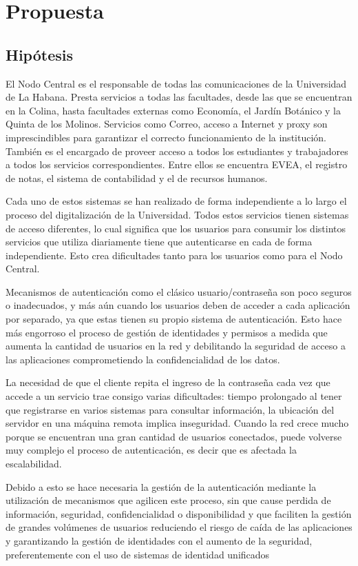 \chapter{Propuesta}\label{chapter:proposal}
\section*{Hipótesis}

El Nodo Central es el responsable de todas las comunicaciones de la Universidad de La Habana. Presta servicios a todas las facultades, desde las que se encuentran en la Colina, hasta facultades externas como Economía, el Jardín Botánico y la Quinta de los Molinos. Servicios como Correo, acceso a Internet y proxy son  imprescindibles para garantizar el correcto funcionamiento de la institución. También es el encargado de proveer acceso a todos los estudiantes y trabajadores a todos los servicios correspondientes. Entre ellos se encuentra EVEA, el registro de notas, el sistema de contabilidad y el de recursos humanos.

Cada uno de estos sistemas se han realizado de forma independiente a lo largo el proceso del digitalización de la Universidad. Todos estos servicios tienen sistemas de acceso diferentes, lo cual significa que los usuarios para consumir los distintos servicios que utiliza diariamente tiene que autenticarse en cada de forma independiente. Esto crea dificultades tanto para los usuarios como para el Nodo Central. 

Mecanismos de autenticación como el clásico usuario/contraseña son poco seguros o inadecuados, y más aún cuando los usuarios deben de acceder a cada aplicación por separado, ya que estas tienen su propio sistema de autenticación. Esto hace más engorroso el proceso de gestión de identidades y permisos a medida que aumenta la cantidad de usuarios en la red y debilitando la seguridad de acceso a las aplicaciones comprometiendo la confidencialidad de los datos.

La necesidad de que el cliente repita el ingreso de la contraseña cada vez que accede a un servicio trae consigo varias dificultades: tiempo prolongado al tener que registrarse en varios sistemas para consultar información, la ubicación del servidor en una máquina remota implica inseguridad. Cuando la red crece mucho porque se encuentran una gran cantidad de usuarios conectados, puede volverse muy complejo el proceso de autenticación, es decir que es afectada la escalabilidad.

Debido a esto se hace necesaria la gestión de la autenticación mediante la utilización de mecanismos que agilicen este proceso, sin que cause perdida de información, seguridad, confidencialidad o disponibilidad y que faciliten la gestión de grandes volúmenes de usuarios reduciendo el riesgo de caída de las aplicaciones y garantizando la gestión de identidades con el aumento de la seguridad, preferentemente con el uso de sistemas de identidad unificados

